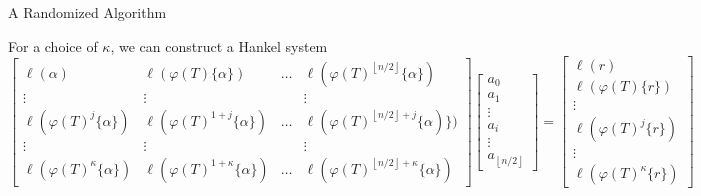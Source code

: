 \documentclass{beamer}
\begin{document}
    \begin{frame}{A Randomized Algorithm}


    \item For a choice of $\kappa$, we can construct a Hankel system
    \footnotesize
\[ \begin{bmatrix}\ell(\alpha) & \ell(\varphi(T)\{\alpha\}) & \ldots & \ell(\varphi(T)^{\left\lfloor n/2 \right\rfloor}\{ \alpha\}) \\ \vdots & \vdots & & \vdots \\ 

\ell(\varphi(T)^{j}\{\alpha\}) & \ell(\varphi(T)^{1+j}\{ \alpha\}) & \ldots & \ell(\varphi(T)^{\left\lfloor n/2 \right\rfloor+j}\{ \alpha)\}) \\ \vdots & \vdots & & \vdots \\

\ell(\varphi(T)^{\kappa}\{\alpha\}) & \ell(\varphi(T)^{1 + \kappa }\{\alpha\}) & \ldots & \ell(\varphi(T)^{\left\lfloor n/2 \right\rfloor + \kappa}\{\alpha\})

\end{bmatrix} \begin{bmatrix} a_0 \\ a_1 \\ \vdots \\ a_i \\ \vdots \\ a_{\left\lfloor n/2 \right\rfloor} \end{bmatrix} = \begin{bmatrix} \ell(r) \\ \ell(\varphi(T)\{r\}) \\ \vdots \\ \ell(\varphi(T)^j\{r\}) \\ \vdots  \\   \ell(\varphi(T)^{\kappa}\{r\}) \end{bmatrix} \]
    
\end{frame}



\end{document}
